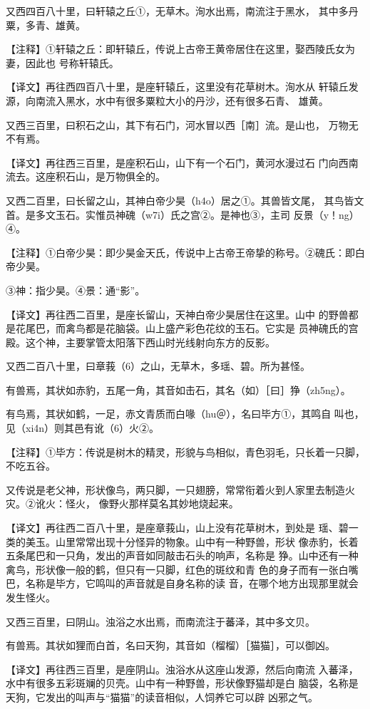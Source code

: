 \documentclass[a4paper,12pt,UTF8,twoside]{ctexbook}
\begin{document}
又西四百八十里，曰轩辕之丘①，无草木。洵水出焉，南流注于黑水， 其中多丹粟，多青、雄黄。

【注释】①轩辕之丘：即轩辕丘，传说上古帝王黄帝居住在这里，娶西陵氏女为妻，因此也 号称轩辕氏。

【译文】再往西四百八十里，是座轩辕丘，这里没有花草树木。洵水从 轩辕丘发源，向南流入黑水，水中有很多粟粒大小的丹沙，还有很多石青、 雄黄。

又西三百里，曰积石之山，其下有石门，河水冒以西［南］流。是山也， 万物无不有焉。

【译文】再往西三百里，是座积石山，山下有一个石门，黄河水漫过石 门向西南流去。这座积石山，是万物俱全的。

又西二百里，曰长留之山，其神白帝少昊（h4o）居之①。其兽皆文尾， 其鸟皆文首。是多文玉石。实惟员神磈（w7i）氏之宫②。是神也③，主司 反景（y！ng）④。

【注释】①白帝少昊：即少昊金天氏，传说中上古帝王帝挚的称号。②磈氏：即白帝少昊。

③神：指少昊。④景：通“影”。

【译文】再往西二百里，是座长留山，天神白帝少昊居住在这里。山中 的野兽都是花尾巴，而禽鸟都是花脑袋。山上盛产彩色花纹的玉石。它实是 员神磈氏的宫殿。这个神，主要掌管太阳落下西山时光线射向东方的反影。

又西二百八十里，曰章莪（6）之山，无草木，多瑶、碧。所为甚怪。

有兽焉，其状如赤豹，五尾一角，其音如击石，其名（如）［曰］狰（zh5ng）。

有鸟焉，其状如鹤，一足，赤文青质而白喙（hu＠），名曰毕方①，其鸣自 叫也，见（xi4n）则其邑有讹（6）火②。

【注释】①毕方：传说是树木的精灵，形貌与鸟相似，青色羽毛，只长着一只脚，不吃五谷。

又传说是老父神，形状像鸟，两只脚，一只翅膀，常常衔着火到人家里去制造火灾。②讹火：怪火， 像野火那样莫名其妙地烧起来。

【译文】再往西二百八十里，是座章莪山，山上没有花草树木，到处是 瑶、碧一类的美玉。山里常常出现十分怪异的物象。山中有一种野兽，形状 像赤豹，长着五条尾巴和一只角，发出的声音如同敲击石头的响声，名称是 狰。山中还有一种禽鸟，形状像一般的鹤，但只有一只脚，红色的斑纹和青 色的身子而有一张白嘴巴，名称是毕方，它鸣叫的声音就是自身名称的读 音，在哪个地方出现那里就会发生怪火。

又西三百里，曰阴山。浊浴之水出焉，而南流注于蕃泽，其中多文贝。

有兽焉。其状如狸而白首，名曰天狗，其音如（榴榴）［猫猫］，可以御凶。

【译文】再往西三百里，是座阴山。浊浴水从这座山发源，然后向南流 入蕃泽，水中有很多五彩斑斓的贝壳。山中有一种野兽，形状像野猫却是白 脑袋，名称是天狗，它发出的叫声与“猫猫”的读音相似，人饲养它可以辟 凶邪之气。
\end{document}
